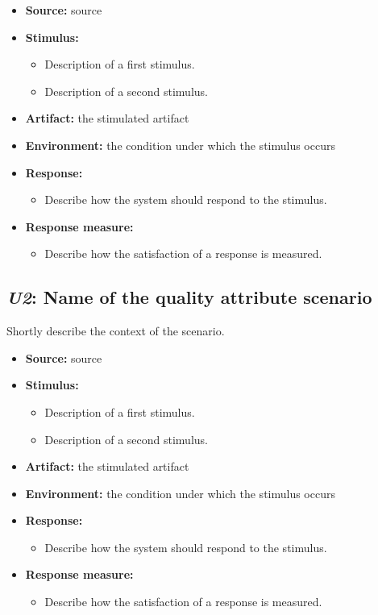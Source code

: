 \documentclass[english]{sareport}
\begin{document}
\begin{itemize}
    \item \textbf{Source:} source
    \item \textbf{Stimulus:}
        \begin{itemize}
            \item Description of a first stimulus.
            \item Description of a second stimulus.
        \end{itemize}

    \item \textbf{Artifact:} the stimulated artifact
    \item \textbf{Environment:} the condition under which the stimulus occurs
    \item \textbf{Response:}
        \begin{itemize}
            \item Describe how the system should respond to the stimulus.
        \end{itemize}

    \item \textbf{Response measure:}
        \begin{itemize}
            \item Describe how the satisfaction of a response is measured.
        \end{itemize}
\end{itemize}

\subsection{\emph{U2}: Name of the quality attribute scenario}
Shortly describe the context of the scenario.

\begin{itemize}
    \item \textbf{Source:} source
    \item \textbf{Stimulus:}
        \begin{itemize}
            \item Description of a first stimulus.
            \item Description of a second stimulus.
        \end{itemize}

    \item \textbf{Artifact:} the stimulated artifact
    \item \textbf{Environment:} the condition under which the stimulus occurs
    \item \textbf{Response:}
        \begin{itemize}
            \item Describe how the system should respond to the stimulus.
        \end{itemize}

    \item \textbf{Response measure:}
        \begin{itemize}
            \item Describe how the satisfaction of a response is measured.
        \end{itemize}
\end{itemize}
\end{document}
